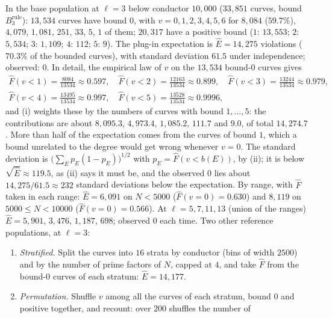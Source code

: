 \begin{sloppypar}
\begin{example}\label{ex:computation:calibration-small}
In the base population at $\ell=3$ below conductor $10{,}000$ ($33{,}851$ curves, bound $B^{\mathrm{rule}}_3$): $13{,}534$ curves have bound $0$, with $v=0,1,2,3,4,5,6$ for
$8{,}084$ ($59.7\%$), $4{,}079$, $1{,}081$, $251$, $33$, $5$, $1$ of them; $20{,}317$ have a positive bound ($1$: $13{,}553$; $2$: $5{,}534$; $3$: $1{,}109$; $4$: $112$; $5$: $9$).
The plug-in expectation is $\hat E=14{,}275$ violations ($70.3\%$ of the bounded curves), with standard deviation $61.5$ under independence; observed:
$0$. In detail, the empirical law of $v$ on the $13{,}534$ bound-$0$ curves gives
\begin{gather*}
\hat F(v<1)=\tfrac{8084}{13534}\approx0.597,\quad \hat F(v<2)=\tfrac{12163}{13534}\approx0.899,\quad \hat F(v<3)=\tfrac{13244}{13534}\approx0.979,\\
\hat F(v<4)=\tfrac{13495}{13534}\approx0.997,\quad \hat F(v<5)=\tfrac{13528}{13534}\approx0.9996,
\end{gather*}
and (i) weights these by the numbers of curves with bound $1,\dots,5$: the contributions are about $8{,}095.3$,
$4{,}973.4$, $1{,}085.2$, $111.7$ and $9.0$, of total $14{,}274.7$. More than half of the expectation comes from the curves of bound $1$, which a bound unrelated to
the degree would get wrong whenever $v=0$. The standard deviation is $\bigl(\sum_Ep_E(1-p_E)\bigr)^{1/2}$ with $p_E=\hat F(v<b(E))$, by
(ii); it is below $\sqrt{\hat E}\approx119.5$, as (ii) says it must be, and the observed $0$ lies about
$14{,}275/61.5\approx232$ standard deviations below the expectation. By range, with $\hat F$ taken in each range: $\hat E=6{,}091$ on $N<5000$ ($\hat F(v=0)=0.630$) and $8{,}119$ on $5000\le N<10000$ ($\hat F(v=0)=0.566$). At
$\ell=5,7,11,13$ (union of the ranges) $\hat E=5{,}901$, $3{,}476$, $1{,}187$, $698$; observed $0$ each time. Two other reference populations, at $\ell=3$:
\begin{enumerate}[label=(\alph*)]
\item \emph{Stratified.} Split the curves into $16$ strata by conductor (bins of width $2500$) and by the number of prime factors of $N$, capped at $4$, and
take $\hat F$ from the bound-$0$ curves of each stratum: $\hat E=14{,}177$.
\item \emph{Permutation.} Shuffle $v$ among all the curves of each stratum, bound $0$ and positive together, and recount: over $200$ shuffles the number of

\end{enumerate}
\end{example}
\end{sloppypar}
